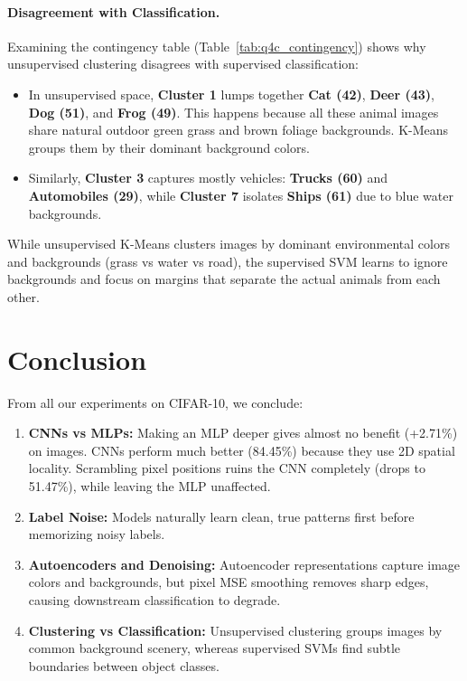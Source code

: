 \documentclass[10pt,twocolumn,letterpaper]{article}
\begin{document}
\paragraph{Disagreement with Classification.}
Examining the contingency table (Table~\ref{tab:q4c_contingency}) shows why unsupervised clustering disagrees with supervised classification:
\begin{itemize}
    \setlength{\itemsep}{1pt}
    \item In unsupervised space, \textbf{Cluster 1} lumps together \textbf{Cat (42)}, \textbf{Deer (43)}, \textbf{Dog (51)}, and \textbf{Frog (49)}. This happens because all these animal images share natural outdoor green grass and brown foliage backgrounds. K-Means groups them by their dominant background colors.
    \item Similarly, \textbf{Cluster 3} captures mostly vehicles: \textbf{Trucks (60)} and \textbf{Automobiles (29)}, while \textbf{Cluster 7} isolates \textbf{Ships (61)} due to blue water backgrounds.
\end{itemize}
While unsupervised K-Means clusters images by dominant environmental colors and backgrounds (grass vs water vs road), the supervised SVM learns to ignore backgrounds and focus on margins that separate the actual animals from each other.

\section{Conclusion}

From all our experiments on CIFAR-10, we conclude:
\begin{enumerate}
    \setlength{\itemsep}{1pt}
    \item \textbf{CNNs vs MLPs:} Making an MLP deeper gives almost no benefit (+2.71\%) on images. CNNs perform much better (84.45\%) because they use 2D spatial locality. Scrambling pixel positions ruins the CNN completely (drops to 51.47\%), while leaving the MLP unaffected.
    \item \textbf{Label Noise:} Models naturally learn clean, true patterns first before memorizing noisy labels.
    \item \textbf{Autoencoders and Denoising:} Autoencoder representations capture image colors and backgrounds, but pixel MSE smoothing removes sharp edges, causing downstream classification to degrade.
    \item \textbf{Clustering vs Classification:} Unsupervised clustering groups images by common background scenery, whereas supervised SVMs find subtle boundaries between object classes.
\end{enumerate}
\end{document}
